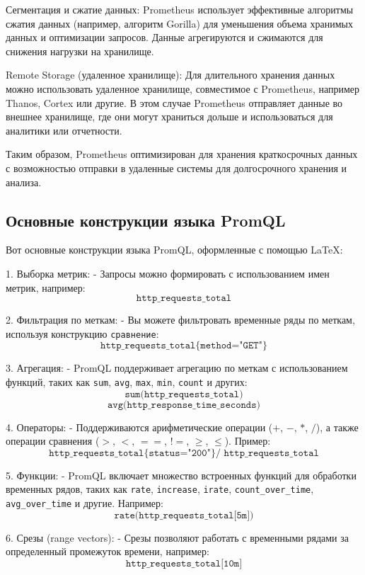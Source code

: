 Сегментация и сжатие данных: Prometheus использует эффективные алгоритмы сжатия данных (например, алгоритм Gorilla) для
уменьшения объема хранимых данных и оптимизации запросов.
Данные агрегируются и сжимаются для снижения нагрузки на хранилище.

Remote Storage (удаленное хранилище): Для длительного хранения данных можно использовать удаленное хранилище,
совместимое с Prometheus, например Thanos, Cortex или другие.
В этом случае Prometheus отправляет данные во внешнее хранилище, где они могут храниться дольше и использоваться для
аналитики или отчетности.

Таким образом, Prometheus оптимизирован для хранения краткосрочных данных с возможностью отправки в удаленные системы
для долгосрочного хранения и анализа.

\subsection{Основные конструкции языка PromQL}

Вот основные конструкции языка PromQL, оформленные с помощью LaTeX:

1. Выборка метрик:
- Запросы можно формировать с использованием имен метрик, например:
\[
    \texttt{http\_requests\_total}
\]

2. Фильтрация по меткам:
- Вы можете фильтровать временные ряды по меткам, используя конструкцию \texttt{сравнение}:
\[
    \texttt{http\_requests\_total\{method="GET"\}}
\]

3. Агрегация:
- PromQL поддерживает агрегацию по меткам с использованием функций, таких как \texttt{sum}, \texttt{avg}, \texttt{max}, \texttt{min}, \texttt{count} и других:
\[
    \texttt{sum(http\_requests\_total)}
\]
\[
    \texttt{avg(http\_response\_time\_seconds)}
\]

4. Операторы:
- Поддерживаются арифметические операции (\(+\), \(-\), \(*\), \(/\)), а также операции сравнения (\(>\), \(<\), \(==\), \(!=\), \(\geq\), \(\leq\)). Пример:
\[
    \texttt{http\_requests\_total\{status="200"\} / http\_requests\_total}
\]

5. Функции:
- PromQL включает множество встроенных функций для обработки временных рядов, таких как \texttt{rate}, \texttt{increase}, \texttt{irate}, \texttt{count\_over\_time}, \texttt{avg\_over\_time} и другие. Например:
\[
    \texttt{rate(http\_requests\_total[5m])}
\]

6. Срезы (range vectors):
- Срезы позволяют работать с временными рядами за определенный промежуток времени, например:
\[
    \texttt{http\_requests\_total[10m]}
\]

